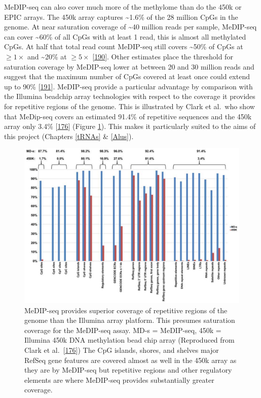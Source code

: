 \documentclass[
]{book}
\begin{document}
MeDIP-seq can also cover much more of the methylome than do the 450k or EPIC arrays.
The 450k array captures \textasciitilde1.6\% of the 28 million CpGs in the genome.
At near saturation coverage of \textasciitilde40 million reads per sample, MeDIP-seq can cover \textasciitilde60\% of all CpGs with at least 1 read, this is almost all methylated CpGs.
At half that total read count MeDIP-seq still covers \textasciitilde50\% of CpGs at \(\ge1\times\) and \textasciitilde20\% at \(\ge5\times\) {[}\protect\hyperlink{ref-Taiwo2012}{190}{]}.
Other estimates place the threshold for saturation coverage by MeDIP-seq lower at between 20 and 30 million reads and suggest that the maximum number of CpGs covered at least once could extend up to 90\% {[}\protect\hyperlink{ref-Chavez2010}{191}{]}.
MeDIP-seq provide a particular advantage by comparison with the Illumina beadchip array technologies with respect to the coverage it provides for repetitive regions of the genome.
This is illustrated by Clark et al.~who show that MeDip-seq covers an estimated 91.4\% of repetitive sequences and the 450k array only 3.4\% {[}\protect\hyperlink{ref-Clark2012}{176}{]} (Figure \ref{fig:Clark2012fig1}).
This makes it particularly suited to the aims of this project (Chapters \ref{tRNAs} \& \ref{Alus}).

\begin{figure}

{\centering \includegraphics[width=0.9\linewidth]{figs/Clark2012fig1MeDIPseqVs450Kcoverage} 

}

\caption{MeDIP-seq provides superior coverage of repetitive regions of the genome than the Illumina array platform. This presumes saturation coverage for the MeDIP-seq assay. MD-s = MeDIP-seq, 450k = Illumina 450k DNA methylation bead chip array (Reproduced from Clark et al.~{[}\protect\hyperlink{ref-Clark2012}{176}{]}) The CpG islands, shores, and shelves major RefSeq gene features are covered almost as well in the 450k array as they are by MeDIP-seq but repetitive regions and other regulatory elements are where MeDIP-seq provides substantially greater coverage.}\label{fig:Clark2012fig1}
\end{figure}
\end{document}
